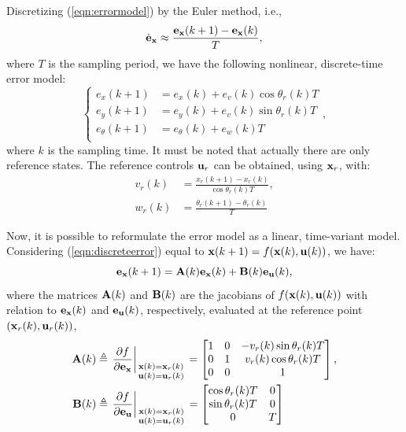 \documentclass[twocolumn]{IEEEtran} %
\begin{document}
Discretizing (\ref{eqn:errormodel}) by the Euler method, i.e.,
\begin{equation*}
	\dot{\bf e}_{\bf x} \approx \frac{{\bf e_x}(k+1)-{\bf e_x}(k)}{T},
\end{equation*}
where $T$ is the sampling period, we have the following nonlinear, discrete-time error model:
\begin{equation}\label{eqn:discreteerror}
	\left\{
		\begin{aligned}
			e_x(k+1)	    &= e_x(k) + e_v(k)\cos\theta_r(k)T \\
			e_y(k+1)	    &= e_y(k) + e_v(k)\sin\theta_r(k)T \\
			e_\theta(k+1) &= e_\theta(k) + e_w(k)T \\
		\end{aligned}
	\right.,
\end{equation}
where $k$ is the sampling time. It must be noted that actually there are only reference states. The reference controls ${\bf u}_r$ can be obtained, using ${\bf x}_r$, with:
\begin{align*}
	v_r(k) &= \frac{x_r(k+1)-x_r(k)}{\cos\theta_r(k) T}, \\
	w_r(k) &= \frac{\theta_r(k+1)-\theta_r(k)}{T}
\end{align*}

Now, it is possible to reformulate the error model as a linear, time-variant model. Considering (\ref{eqn:discreteerror}) equal to \mbox{${\bf x}(k+1)=f({\bf x}(k),{\bf u}(k))$}, we have:
\begin{equation}\label{eqn:error2}
	{\bf e}_{\bf x}(k+1) = {\bf A}(k){\bf e_x}(k) + {\bf B}(k){\bf e_u}(k),
\end{equation}
where the matrices ${\bf A}(k)$ and ${\bf B}(k)$ are the jacobians of $f({\bf x}(k),{\bf u}(k))$ with relation to ${\bf e_x}(k)$ and ${\bf e_u}(k)$, respectively, evaluated at the reference point $({\bf x}_r(k),{\bf u}_r(k))$,
\begin{align*}
	{\bf A}(k) &\triangleq \left.\frac{\partial f}{\partial{\bf e}_{\bf x}}\right|_{\begin{smallmatrix}{\bf x}(k)={\bf x}_r(k) \\ {\bf u}(k)={\bf u}_r(k) \end{smallmatrix}} = \begin{bmatrix}
		1 & 0 & -v_r(k)\sin\theta_r(k)T \\
		0 & 1 &  v_r(k)\cos\theta_r(k)T \\
		0 & 0 & 1
	\end{bmatrix}, \\
	{\bf B}(k) &\triangleq \left.\frac{\partial f}{\partial{\bf e}_{\bf u}}\right|_{\begin{smallmatrix}{\bf x}(k)={\bf x}_r(k) \\ {\bf u}(k)={\bf u}_r(k) \end{smallmatrix}} = \begin{bmatrix}
		\cos\theta_r(k)T & 0 \\
		\sin\theta_r(k)T & 0 \\
		0 			  & T
	\end{bmatrix}
\end{align*}
\end{document}
